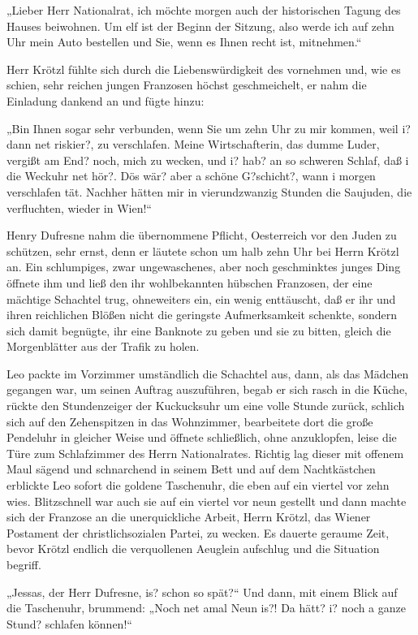 „Lieber Herr Nationalrat, ich möchte morgen auch der historischen
Tagung des Hauses beiwohnen. Um elf ist der Beginn der Sitzung,
also werde ich auf zehn Uhr mein Auto bestellen und Sie, wenn es
Ihnen recht ist, mitnehmen.“

Herr Krötzl fühlte sich durch die Liebenswürdigkeit des vornehmen
und, wie es schien, sehr reichen jungen Franzosen 
höchst geschmeichelt, er nahm die Einladung dankend an und fügte
hinzu:

„Bin Ihnen sogar sehr verbunden, wenn Sie um zehn Uhr zu mir
kommen, weil i? dann net riskier?, zu verschlafen. Meine
Wirtschafterin, das dumme Luder, vergißt am End? noch, mich zu
wecken, und i? hab? an so schweren Schlaf, daß i die Weckuhr net
hör?. Dös wär? aber a schöne G?schicht?, wann i morgen verschlafen
tät. Nachher hätten mir in vierundzwanzig Stunden die Saujuden, die
verfluchten, wieder in Wien!“

Henry Dufresne nahm die übernommene Pflicht, Oesterreich vor den
Juden zu schützen, sehr ernst, denn er läutete schon um halb zehn
Uhr bei Herrn Krötzl an. Ein schlumpiges, zwar ungewaschenes, aber
noch geschminktes junges Ding öffnete ihm und ließ den ihr
wohlbekannten hübschen Franzosen, der eine mächtige Schachtel trug,
ohneweiters ein, ein wenig enttäuscht, daß er ihr und ihren
reichlichen Blößen nicht die geringste Aufmerksamkeit schenkte,
sondern sich damit begnügte, ihr eine Banknote zu geben und sie zu
bitten, gleich die Morgenblätter aus der Trafik zu holen.

Leo packte im Vorzimmer umständlich die Schachtel aus, dann, als
das Mädchen gegangen war, um seinen Auftrag auszuführen, begab er
sich rasch in die Küche, rückte den Stundenzeiger der Kuckucksuhr
um eine volle Stunde zurück, schlich sich auf den Zehenspitzen in
das Wohnzimmer, bearbeitete dort die große Pendeluhr in gleicher
Weise und öffnete schließlich, ohne anzuklopfen, leise die Türe zum
Schlafzimmer des Herrn Nationalrates. Richtig lag dieser mit
offenem Maul sägend und schnarchend in seinem Bett 
und auf dem Nachtkästchen erblickte Leo sofort die goldene
Taschenuhr, die eben auf ein viertel vor zehn wies. Blitzschnell
war auch sie auf ein viertel vor neun gestellt und dann machte sich
der Franzose an die unerquickliche Arbeit, Herrn Krötzl, das Wiener
Postament der christlichsozialen Partei, zu wecken. Es dauerte
geraume Zeit, bevor Krötzl endlich die verquollenen Aeuglein
aufschlug und die Situation begriff.

„Jessas, der Herr Dufresne, is? schon so spät?“ Und dann, mit einem
Blick auf die Taschenuhr, brummend: „Noch net amal Neun is?! Da
hätt? i? noch a ganze Stund? schlafen können!“

